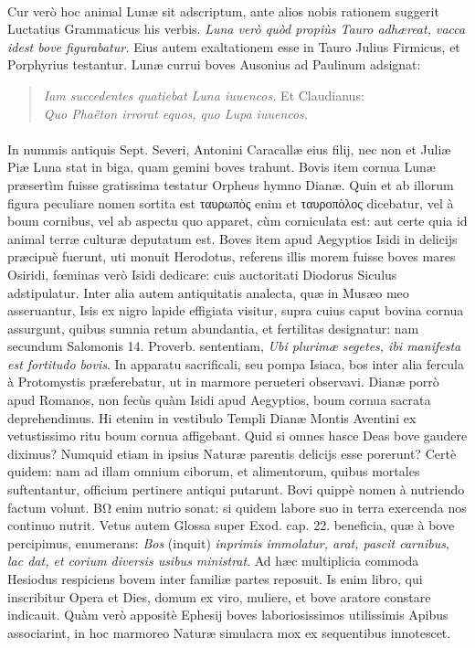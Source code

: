 \documentclass[a4paper, 11pt, oneside, polutonikogreek, latin]{article}
\begin{document}
\paragraph{}
Cur verò hoc animal Lunæ sit adscriptum, ante alios nobis rationem suggerit Luctatius Grammaticus his verbis. \emph{Luna verò quòd propiùs Tauro adhæreat, vacca idest bove figurabatur.} Eius autem exaltationem esse in Tauro Julius Firmicus, et Porphyrius testantur. Lunæ currui boves Ausonius ad Paulinum adsignat:
\begin{quote}
\emph{Iam succedentes quatiebat Luna iuuencos.} Et Claudianus:\\
\emph{Quo Phaëton irrorat equos, quo Lupa iuuencos.}\\
\end{quote}
\vspace*{-8mm}
\paragraph{}
In nummis antiquis Sept. Severi, Antonini Caracallæ eius filij, nec non et Juliæ Piæ Luna stat in biga, quam gemini boves trahunt. Bovis item cornua Lunæ præsertìm fuisse gratissima testatur Orpheus hymno Dianæ. Quin et ab illorum figura peculiare nomen sortita est ταυρωπὸς enim et ταυροπὸλος dicebatur, vel à boum cornibus, vel ab aspectu quo apparet, cùm corniculata est: aut certe quia id animal terræ culturæ deputatum est. Boves item apud Aegyptios Isidi in delicijs præcipuè fuerunt, uti monuit Herodotus, referens illis morem fuisse boves mares Osiridi, fœminas verò Isidi dedicare: cuis auctoritati Diodorus Siculus adstipulatur. Inter alia autem antiquitatis analecta, quæ in Musæo meo asseruantur, Isis ex nigro lapide effigiata visitur, supra cuius caput bovina cornua assurgunt, quibus sumnia retum abundantia, et fertilitas designatur: nam secundum Salomonis 14. Proverb. sententiam, \emph{Ubi plurimæ segetes, ibi manifesta est fortitudo bovis}. In apparatu sacrificali, seu pompa Isiaca, bos inter alia fercula à Protomystis præferebatur, ut in marmore perueteri observavi. Dianæ porrò apud Romanos, non fecùs quàm Isidi apud Aegyptios, boum cornua sacrata deprehendimus. Hi etenim in vestibulo Templi Dianæ Montis Aventini ex vetustissimo ritu boum cornua affigebant. Quid si omnes hasce Deas bove gaudere diximus? Numquid etiam in ipsius Naturæ parentis delicijs esse porerunt? Certè quidem: nam ad illam omnium ciborum, et alimentorum, quibus mortales suftentantur, officium pertinere antiqui putarunt. Bovi quippè nomen à nutriendo factum volunt. BΩ enim nutrio sonat: si quidem labore suo in terra exercenda nos continuo nutrit. Vetus autem Glossa super Exod. cap. 22. beneficia, quæ à bove percipimus, enumerans: \emph{Bos} (inquit) \emph{inprimis immolatur, arat, pascit carnibus, lac dat, et corium diversis usibus ministrat}. Ad hæc multiplicia commoda Hesiodus respiciens bovem inter familiæ partes reposuit. Is enim libro, qui inscribitur Opera et Dies, domum ex viro, muliere, et bove aratore constare indicauit. Quàm verò appositè Ephesij boves laboriosissimos utilissimis Apibus associarint, in hoc marmoreo Naturæ simulacra mox ex sequentibus innotescet.
\clearpage
\end{document}
